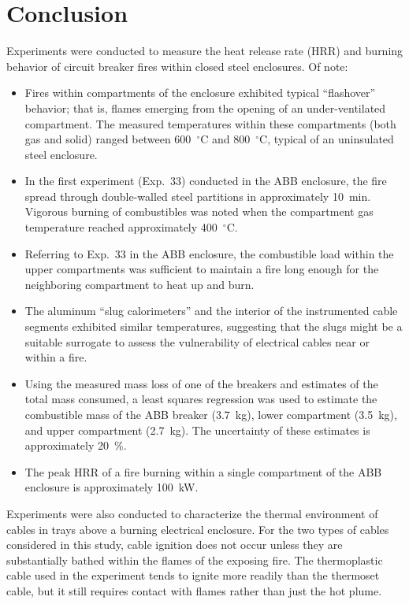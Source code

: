 \clearpage

\section{Conclusion}

Experiments were conducted to measure the heat release rate (HRR) and burning behavior of circuit breaker fires within closed steel enclosures. Of note:
\begin{itemize}
\item Fires within compartments of the enclosure exhibited typical ``flashover'' behavior; that is, flames emerging from the opening of an under-ventilated compartment. The measured temperatures within these compartments (both gas and solid) ranged between 600~$^\circ$C and 800~$^\circ$C, typical of an uninsulated steel enclosure.
\item In the first experiment (Exp.~33) conducted in the ABB enclosure, the fire spread through double-walled steel partitions in approximately 10~min. Vigorous burning of combustibles was noted when the compartment gas temperature reached approximately 400~$^\circ$C.
\item Referring to Exp.~33 in the ABB enclosure, the combustible load within the upper compartments was sufficient to maintain a fire long enough for the neighboring compartment to heat up and burn.
\item The aluminum ``slug calorimeters'' and the interior of the instrumented cable segments exhibited similar temperatures, suggesting that the slugs might be a suitable surrogate to assess the vulnerability of electrical cables near or within a fire.
\item Using the measured mass loss of one of the breakers and estimates of the total mass consumed, a least squares regression was used to estimate the combustible mass of the ABB breaker (3.7~kg), lower compartment (3.5~kg), and upper compartment (2.7~kg). The uncertainty of these estimates is approximately 20~\%.
\item The peak HRR of a fire burning within a single compartment of the ABB enclosure is approximately 100~kW.
\end{itemize}


Experiments were also conducted to characterize the thermal environment of cables in trays above a burning electrical enclosure. For the two types of cables considered in this study, cable ignition does not occur unless they are substantially bathed within the flames of the exposing fire. The thermoplastic cable used in the experiment tends to ignite more readily than the thermoset cable, but it still requires contact with flames rather than just the hot plume.


